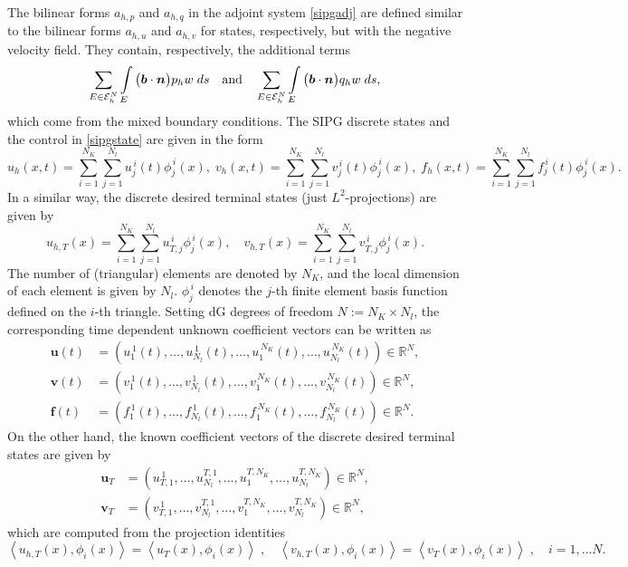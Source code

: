 \documentclass[preprint,12pt]{elsarticle}
\newcommand {\la}[1] {\left\langle {#1} \right\rangle }
\begin{document}
The bilinear forms $a_{h,p}$ and $a_{h,q}$ in the adjoint system \eqref{sipgadj} are defined similar to the bilinear forms $a_{h,u}$ and $a_{h,v}$ for states, respectively, but with the negative velocity field. They contain, respectively, the additional terms
$$
\sum \limits_{E \in \mathcal{E}^N_h}  \int \limits_E \big( \bm{b} \cdot \bm{n} \big) p_h w\; ds \quad \hbox{and} \quad \sum \limits_{E \in \mathcal{E}^N_h}  \int \limits_E \big( \bm{b} \cdot \bm{n} \big) q_h w\; ds,
$$
which come from the mixed boundary conditions.
The SIPG discrete states and the control in \eqref{sipgstate} are given in the form
\begin{equation*}
u_h(x,t) = \sum \limits_{i=1}^{N_K} \sum \limits_{j=1}^{N_{l}} u_{j}^{\,i}(t) \phi_{j}^{\,i}(x), \;
v_h(x,t) = \sum \limits_{i=1}^{N_K} \sum \limits_{j=1}^{N_{l}} v_{j}^{\,i}(t) \phi_{j}^{\,i}(x), \;
f_h(x,t) = \sum \limits_{i=1}^{N_K} \sum \limits_{j=1}^{N_{l}} f_{j}^{\,i}(t) \phi_{j}^{\,i}(x).
\end{equation*}
In a similar way, the discrete desired terminal states (just $L^2$-projections) are given by
\begin{equation*}
u_{h,T}(x) = \sum \limits_{i=1}^{N_K} \sum \limits_{j=1}^{N_{l}} u_{T,j}^{\,i} \phi_{j}^{\,i}(x), \quad
v_{h,T}(x) = \sum \limits_{i=1}^{N_K} \sum \limits_{j=1}^{N_{l}} v_{T,j}^{\,i} \phi_{j}^{\,i}(x).
\end{equation*}
The number of (triangular) elements are denoted by $N_K$, and the local dimension of each element is given by $N_{l}$. $\phi_{j}^{\,i}$ denotes the $j$-th finite element basis function defined on the $i$-th triangle. Setting dG degrees of freedom $N:=N_K\times N_l$, the corresponding time dependent unknown coefficient vectors can be written as
\begin{align*}
\bm{u}(t) &= (u_{1}^{\,1}(t), \ldots, u^{\,1}_{N_l}(t), \ldots, u^{\,N_K}_{1}(t), \ldots, u^{\,N_K}_{N_l}(t))\in\mathbb{R}^N, \\
\bm{v}(t) &= (v_{1}^{\,1}(t), \ldots, v^{\,1}_{N_l}(t), \ldots, v^{\,N_K}_{1}(t), \ldots, v^{\,N_K}_{N_l}(t))\in\mathbb{R}^N, \\
\bm{f}(t) &= (f_{1}^{\,1}(t), \ldots, f^{\,1}_{N_l}(t), \ldots, f^{\,N_K}_{1}(t), \ldots, f^{\,N_K}_{N_l}(t))\in\mathbb{R}^N.
\end{align*}
On the other hand, the known coefficient vectors of the discrete desired terminal states are given by
\begin{align*}
\bm{u}_T &= (u_{T,1}^{\,1}, \ldots, u^{T,1}_{N_l}, \ldots, u^{T,N_K}_{1}, \ldots, u^{T,N_K}_{N_l})\in\mathbb{R}^N, \\
\bm{v}_T &= (v_{T,1}^{\,1}, \ldots, v^{T,1}_{N_l}, \ldots, v^{T,N_K}_{1}, \ldots, v^{T,N_K}_{N_l})\in\mathbb{R}^N,
\end{align*}
which are computed from the projection identities
\begin{equation*}
\la{u_{h,T}(x),\phi_i(x)} = \la{u_T(x),\phi_i(x)} \; , \quad  \la{v_{h,T}(x),\phi_i(x)} = \la{v_T(x),\phi_i(x)}\; , \quad i=1,\ldots N.
\end{equation*}
\end{document}
